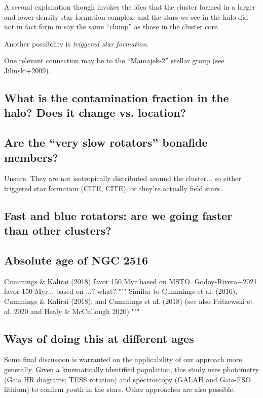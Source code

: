 \documentclass[12pt,twocolumn,tighten]{aastex63}
\begin{document}
A second explanation though invokes
the idea that the cluster formed in a larger and lower-density star
formation complex, and the stars we see in the halo did not in fact
form in say the same ``clump'' as those in the cluster core.

Another possibility is {\it triggered star formation}.

One relevant connection may be to the ``Mamajek-2'' stellar group
(see Jilinski+2009).

\subsection{What is the contamination fraction in the halo? Does it change vs. location?}

\subsection{Are the ``very slow rotators'' bonafide members?}
Unsure. They are not isotropically distributed around the
cluster... so either triggered star formation (CITE, CITE), or they're
actually field stars.


\subsection{Fast and blue rotators: are we going faster than other clusters?}

\subsection{Absolute age of NGC 2516}
Cummings \& Kalirai (2018) favor 150 Myr based on MSTO.
Godoy-Rivera+2021 favor 150 Myr... based on ...? what?
"""
Similar to Cummings et al. (2016), Cummings \& Kalirai (2018),
and Cummings et al. (2018) (see also Fritzewski et al. 2020 and Healy
\&
McCullough 2020)
"""

\subsection{Ways of doing this at different ages}
Some final discussion is warranted on the applicability of our
approach more generally.  Given a kinematically
identified population, this study uses photometry (Gaia HR diagrams;
TESS rotation) and spectroscopy (GALAH and Gaia-ESO lithium) to
confirm youth in the stars.  Other approaches are also possible.
\end{document}
